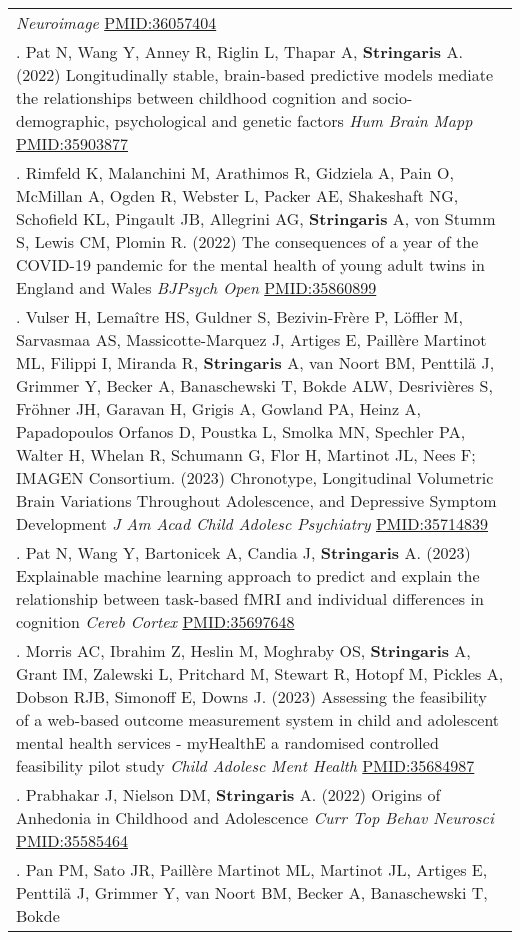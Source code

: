 \documentclass[
]{article}
\begin{document}
\begin{longtable}[]{@{}
  >{\raggedright\arraybackslash}p{}@{}}
\emph{Neuroimage} \url{PMID:36057404} \\
32. Pat N, Wang Y, Anney R, Riglin L, Thapar A, \textbf{Stringaris} A.
(2022) Longitudinally stable, brain-based predictive models mediate the
relationships between childhood cognition and socio-demographic,
psychological and genetic factors \emph{Hum Brain Mapp}
\url{PMID:35903877} \\
33. Rimfeld K, Malanchini M, Arathimos R, Gidziela A, Pain O, McMillan
A, Ogden R, Webster L, Packer AE, Shakeshaft NG, Schofield KL, Pingault
JB, Allegrini AG, \textbf{Stringaris} A, von Stumm S, Lewis CM, Plomin
R. (2022) The consequences of a year of the COVID-19 pandemic for the
mental health of young adult twins in England and Wales \emph{BJPsych
Open} \url{PMID:35860899} \\
34. Vulser H, Lemaître HS, Guldner S, Bezivin-Frère P, Löffler M,
Sarvasmaa AS, Massicotte-Marquez J, Artiges E, Paillère Martinot ML,
Filippi I, Miranda R, \textbf{Stringaris} A, van Noort BM, Penttilä J,
Grimmer Y, Becker A, Banaschewski T, Bokde ALW, Desrivières S, Fröhner
JH, Garavan H, Grigis A, Gowland PA, Heinz A, Papadopoulos Orfanos D,
Poustka L, Smolka MN, Spechler PA, Walter H, Whelan R, Schumann G, Flor
H, Martinot JL, Nees F; IMAGEN Consortium. (2023) Chronotype,
Longitudinal Volumetric Brain Variations Throughout Adolescence, and
Depressive Symptom Development \emph{J Am Acad Child Adolesc Psychiatry}
\url{PMID:35714839} \\
35. Pat N, Wang Y, Bartonicek A, Candia J, \textbf{Stringaris} A. (2023)
Explainable machine learning approach to predict and explain the
relationship between task-based fMRI and individual differences in
cognition \emph{Cereb Cortex} \url{PMID:35697648} \\
36. Morris AC, Ibrahim Z, Heslin M, Moghraby OS, \textbf{Stringaris} A,
Grant IM, Zalewski L, Pritchard M, Stewart R, Hotopf M, Pickles A,
Dobson RJB, Simonoff E, Downs J. (2023) Assessing the feasibility of a
web-based outcome measurement system in child and adolescent mental
health services - myHealthE a randomised controlled feasibility pilot
study \emph{Child Adolesc Ment Health} \url{PMID:35684987} \\
37. Prabhakar J, Nielson DM, \textbf{Stringaris} A. (2022) Origins of
Anhedonia in Childhood and Adolescence \emph{Curr Top Behav Neurosci}
\url{PMID:35585464} \\
38. Pan PM, Sato JR, Paillère Martinot ML, Martinot JL, Artiges E,
Penttilä J, Grimmer Y, van Noort BM, Becker A, Banaschewski T, Bokde

\end{longtable}
\end{document}
